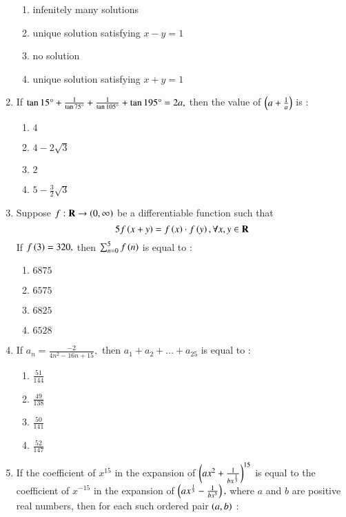 \documentclass[journal,12pt,twocolumn]{IEEEtran}
\theoremstyle{remark}
\begin{document}
\begin{enumerate}
    \begin{enumerate}
        \item infenitely many solutions
        \item unique solution satisfying $x-y=1$
        \item no solution
        \item unique solution satisfying $x+y=1$
    \end{enumerate}
    \item If $\tan 15\degree +\frac{1}{\tan 75\degree}+\frac{1}{\tan 105\degree}+\tan 195\degree =2a,$ then the value of $\left(a+\frac{1}{a}\right)$ is $:$\\
    \begin{enumerate}
        \item $4$
        \item $4-2\sqrt{3}$
        \item $2$
        \item $5-\frac{3}{2}\sqrt{3}$
    \end{enumerate}
    \item Suppose $f :\textbf{R} \to \left(0,\infty\right)$ be a differentiable function such that $$5f\left(x+y\right)=f\left(x\right)\cdot f\left(y\right),\forall x,y \in \textbf{R}$$ If $f\left(3\right)=320,$ then $\sum_{n=0}^5f\left(n\right)$ is equal to $:$\\
    \begin{enumerate}
        \item $6875$
        \item $6575$
        \item $6825$
        \item $6528$
    \end{enumerate}
    \item If $a_n=\frac{-2}{4n^2-16n+15},$ then $a_1+a_2+\dots +a_25$ is equal to $:$\\
    \begin{enumerate}
        \item $\frac{51}{144}$
        \item $\frac{49}{138}$
        \item $\frac{50}{141}$
        \item $\frac{52}{147}$
    \end{enumerate}
    \item If the coefficient of $x^{15}$ in the expansion of $\left(ax^2+\frac{1}{bx^{\frac{1}{3}}}\right)^{15}$ is equal to the coefficient of $x^{-15}$ in the expansion of $\left(ax^{\frac{1}{3}}-\frac{1}{bx^3}\right),$ where $a$ and $b$ are positive real numbers, then for each such ordered pair $\left(a,b\right)$ $:$\\

\end{enumerate}
\end{document}

